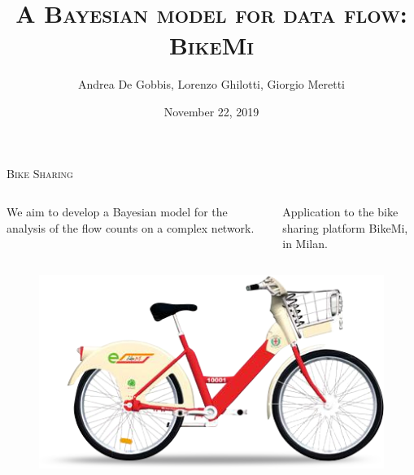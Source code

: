\documentclass{beamer}
\title{\textsc{A Bayesian model for data flow: BikeMi}}
\subtitle{}
\author{Andrea De Gobbis, Lorenzo Ghilotti, Giorgio Meretti}
\institute{Politecnico di Milano}
\date{November 22, 2019}
\begin{document}
	\begin{frame}
	\maketitle	
\end{frame}


\begin{frame}{\textsc{Bike Sharing}}

\begin{columns}[c]
	\hspace{10pt}
	\begin{column}{0.5\textwidth}
		We aim to develop a Bayesian model for the analysis of the \alert{flow counts} on a \alert{complex network}.
	\end{column}
	\hspace{5pt}
	\vrule{}
	\hspace{10pt}
	\begin{column}{0.50\textwidth}
		 Application to the bike sharing platform \alert{BikeMi},\\ in Milan.
	\end{column}
\end{columns}

\begin{figure}[H]
	\centering
	\includegraphics[width=0.6\linewidth]{pictures/bikemi.png} 
	\label{fig1}
\end{figure}
  
 
  
\end{frame}
\end{document}
